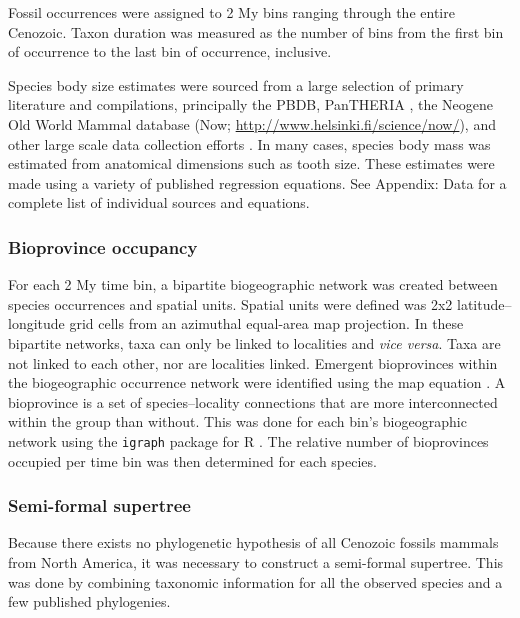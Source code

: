 \documentclass[12pt,letterpaper]{article}
\begin{document}
Fossil occurrences were assigned to 2 My bins ranging through the entire Cenozoic. Taxon duration was measured as the number of bins from the first bin of occurrence to the last bin of occurrence, inclusive.

Species body size estimates were sourced from a large selection of primary literature and compilations, principally the PBDB, PanTHERIA \citep{Jones2009c}, the Neogene Old World Mammal database (Now; \url{http://www.helsinki.fi/science/now/}), and other large scale data collection efforts \citep{Smith2004c, Raia2012f, Brook2004a, Freudenthal2013, McKenna2011}. In many cases, species body mass was estimated from anatomical dimensions such as tooth size. These estimates were made using a variety of published regression equations. See Appendix: Data for a complete list of individual sources and equations. %


\subsubsection{Bioprovince occupancy}

For each 2 My time bin, a bipartite biogeographic network was created between species occurrences and spatial units. Spatial units were defined was 2x2 latitude--longitude grid cells from an azimuthal equal-area map projection. In these bipartite networks, taxa can only be linked to localities and \textit{vice versa}. Taxa are not linked to each other, nor are localities linked. Emergent bioprovinces within the biogeographic occurrence network were identified using the map equation \citep{Rosvall2008,Rosvall2009a}. A bioprovince is a set of species--locality connections that are more interconnected within the group than without. This was done for each bin's biogeographic network using the \texttt{igraph} package for R \citep{csardi2006igraph,2014language}. The relative number of bioprovinces occupied per time bin was then determined for each species. %


\subsubsection{Semi-formal supertree}

Because there exists no phylogenetic hypothesis of all Cenozoic fossils mammals from North America, it was necessary to construct a semi-formal supertree. This was done by combining taxonomic information for all the observed species and a few published phylogenies.
\end{document}

